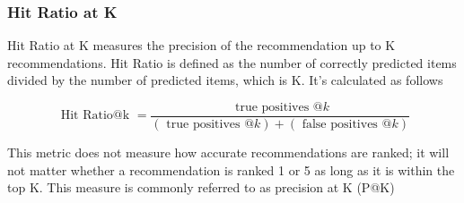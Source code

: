 \documentclass{kththesis}
\begin{document}
\subsubsection{Hit Ratio at K}
Hit Ratio at K measures the precision of the recommendation up to K recommendations. Hit Ratio is defined as the
number of correctly predicted items divided by the number of predicted
items, which is K. It's calculated as follows

\begin{equation}
\text { Hit Ratio@k }=\frac{\text { true positives } @ k}{(\text { true positives } @ k)+(\text { false positives } @ k)}
\end{equation}

This metric does not measure how accurate recommendations are ranked; it will not matter whether a recommendation is ranked 1 or 5 as long as it is within the top K. This measure is commonly referred to as precision at K (P@K)



\end{document}
